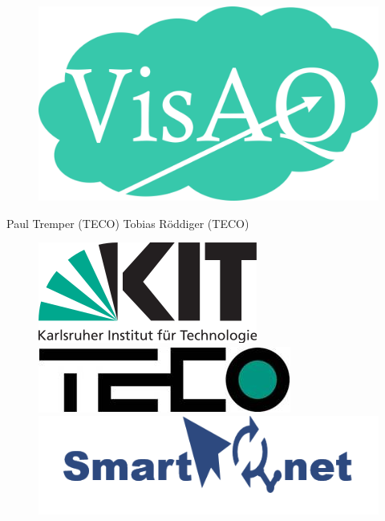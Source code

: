 \begin{titlepage}
    \maketitle
    \begin{tcolorbox}
        \centering
        {\Huge \textbf{\softwarename}}\\
        {\huge \longSoftwarename}\\
    \end{tcolorbox}
    \begin{figure}[h]
        \centering
        \includegraphics[scale=1] {media/logoHQ.png}
    \end{figure}
    \vspace{0.5cm}
    \centering
    Paul Tremper (TECO)
    \hspace{1cm}
    Tobias Röddiger (TECO)
    \begin{figure}[h]
        \centering
        \includegraphics[scale=0.27] {media/KIT_Logo.png}
        \hspace{3cm}
        \vspace{0.5cm}
        \includegraphics[scale=0.75] {media/teco.jpg}
        \includegraphics[scale=0.35]{media/SmartAQnet_logo.png}
    \end{figure}
\end{titlepage}

\tableofcontents